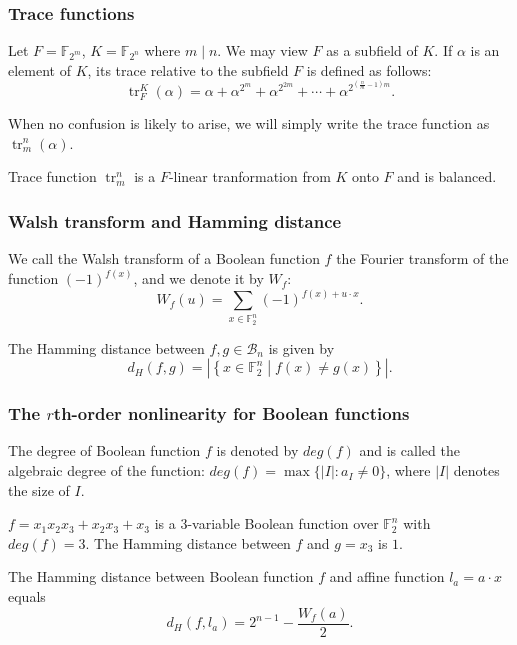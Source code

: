 \documentclass[
    aspectratio=169,                   %
]{beamer}
\newcommand{\F}{\mathbb{F}}
\newcommand{\Bn}{\mathcal{B}_n}
\begin{document}
    \begin{frame}
        \frametitle{Trace functions}
    
        \begin{definition}
            Let $ F = \F_{2^m} $, $ K = \F_{2^n} $ where $ m\mid n $. We may view $ F $ as a subfield of $ K $. 
            If $ \alpha $ is an element of $ K $, its trace relative to the subfield $ F $ is defined as follows: 
            \[\operatorname{tr}_F^K(\alpha)=\alpha+\alpha^{2^m}+\alpha^{2^{2m}}+\cdots+\alpha^{2^{\left(\frac{n}{m}-1\right)m}}.\]
        \end{definition}
        When no confusion is likely to arise, we will simply write the trace function as $ \operatorname{tr}_m^n(\alpha) $.
        \begin{remark}
            Trace function $ \operatorname{tr}_m^n $ is a $ F $-linear tranformation from $ K $ onto $ F $ and is balanced.
        \end{remark}
    
    \end{frame}
    \begin{frame}
        \frametitle{Walsh transform and Hamming distance}
    
        \begin{definition}
            We call the Walsh transform of a Boolean function $f$ the Fourier transform of 
            the function $ (-1)^{f(x)} $, and we denote it by $ W_f $: 
            \[W_f(u) = \sum_{x\in\F_{2}^n}(-1)^{f(x)+u\cdot x}.\]
        \end{definition}
        \begin{definition}
            The Hamming distance between $f,g\in\Bn$ is given by \[ d_H(f,g) = |\left\{x\in\F_2^n\middle|f(x)\ne g(x)\right\}|.\]
        \end{definition}
    \end{frame}
    \begin{frame}
        \frametitle{The $ r $th-order nonlinearity for Boolean functions}
        
        \begin{definition}
            The degree of Boolean function $ f $ is denoted by $ deg(f) $ and is called the algebraic degree of the function: 
            $ deg(f) = \max\{|I|: a_I \ne 0\} $, where $ |I| $ denotes the size of $ I $.
        \end{definition}

        \begin{example}
            $ f=x_1x_2x_3+x_2x_3+x_3 $ is a $3$-variable Boolean function over $ \F_2^n $ with $ deg(f)=3 $.
            The Hamming distance between $ f $ and $ g=x_3 $ is $ 1 $.
        \end{example}
        \begin{remark}
            The Hamming distance between Boolean function $ f $ and affine function $ l_a=a\cdot x $ equals
            \[d_H(f,l_a)=2^{n-1}-\frac{W_f(a)}{2}.\]   
        \end{remark}
    \end{frame}
\end{document}
